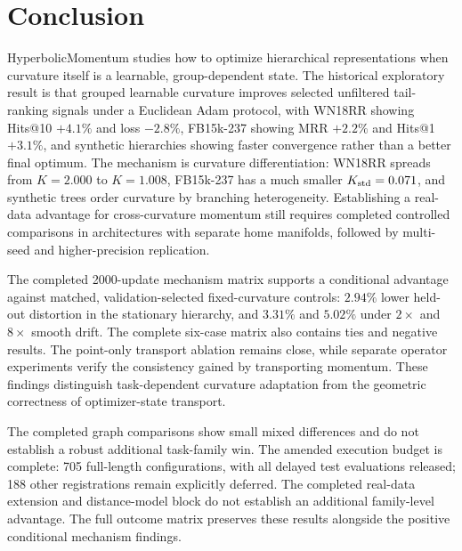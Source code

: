 \section{Conclusion}

HyperbolicMomentum studies how to optimize hierarchical representations when curvature itself is a learnable, group-dependent state. The historical exploratory result is that grouped learnable curvature improves selected unfiltered tail-ranking signals under a Euclidean Adam protocol, with WN18RR showing Hits@10 $+4.1\%$ and loss $-2.8\%$, FB15k-237 showing MRR $+2.2\%$ and Hits@1 $+3.1\%$, and synthetic hierarchies showing faster convergence rather than a better final optimum. The mechanism is curvature differentiation: WN18RR spreads from $K=2.000$ to $K=1.008$, FB15k-237 has a much smaller $K_{\mathrm{std}}=0.071$, and synthetic trees order curvature by branching heterogeneity. Establishing a real-data advantage for cross-curvature momentum still requires completed controlled comparisons in architectures with separate home manifolds, followed by multi-seed and higher-precision replication.

The completed 2000-update mechanism matrix supports a conditional advantage against matched, validation-selected fixed-curvature controls: $2.94\%$ lower held-out distortion in the stationary hierarchy, and $3.31\%$ and $5.02\%$ under $2\times$ and $8\times$ smooth drift. The complete six-case matrix also contains ties and negative results. The point-only transport ablation remains close, while separate operator experiments verify the consistency gained by transporting momentum. These findings distinguish task-dependent curvature adaptation from the geometric correctness of optimizer-state transport.

The completed graph comparisons show small mixed differences and do not establish a robust additional task-family win. The amended execution budget is complete: 705 full-length configurations, with all delayed test evaluations released; 188 other registrations remain explicitly deferred. The completed real-data extension and distance-model block do not establish an additional family-level advantage. The full outcome matrix preserves these results alongside the positive conditional mechanism findings.
